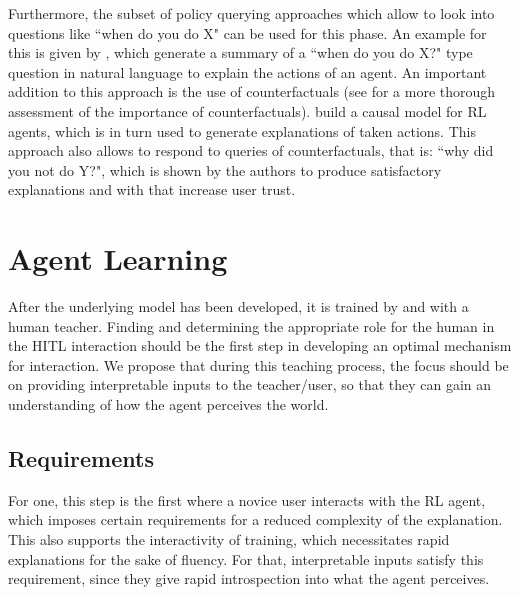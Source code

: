 \documentclass[twoside,11pt]{article}
\begin{document}
Furthermore, the subset of policy querying approaches which allow to look into questions like ``when do you do X" can be used for this phase.
An example for this is given by \citet{HayesShah:2017:AutonomousPolicyExplanation}, which generate a summary of a ``when do you do X?" type question in natural language to explain the actions of an agent. An important addition to this approach is the use of counterfactuals (see \citet{EvansEtAl:2021:ExplainabilityParadox} for a more thorough assessment of the importance of counterfactuals). \citet{MadumalEtAl:2020:CausalRLCFs} build a causal model for RL agents, which is in turn used to generate explanations of taken actions. This approach also allows to respond to queries of counterfactuals, that is: ``why did you not do Y?", which is shown by the authors to produce satisfactory explanations and with that increase user trust.

\section{Agent Learning}


After the underlying model has been developed, it is trained by and with a human teacher.
Finding and determining the appropriate role for the human in the HITL interaction should be the first step in developing an optimal mechanism for interaction. We propose that during this teaching process, the focus should be on providing interpretable inputs to the teacher/user, so that they can gain an understanding of how the agent perceives the world.

\subsection{Requirements}
For one, this step is the first where a novice user interacts with the RL agent, which imposes certain requirements for a reduced complexity of the explanation. This also supports the interactivity of training, which necessitates rapid explanations for the sake of fluency. For that, interpretable inputs satisfy this requirement, since they give rapid introspection into what the agent perceives.
\end{document}
